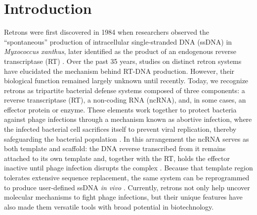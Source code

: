 

\chapter{Introduction}
\label{chapter1}
\thispagestyle{empty}


Retrons were first discovered in 1984 when researchers observed the
``spontaneous'' production of intracellular single-stranded DNA (ssDNA) in
\textit{Myxococcus xanthus}, later identified as the product of an endogenous
reverse transcriptase (RT) \cite{yee1984,lampson1989}. Over the past 35 years,
studies on distinct retron systems have elucidated the mechanism behind RT-DNA
production. However, their biological function remained largely unknown until
recently. Today, we recognize retrons as tripartite bacterial defense systems
composed of three components: a reverse transcriptase (RT), a non-coding RNA
(ncRNA), and, in some cases, an effector protein or enzyme. These elements work
together to protect bacteria against phage infections through a mechanism known
as abortive infection, where the infected bacterial cell sacrifices itself to
prevent viral replication, thereby safeguarding the bacterial population
\cite{millman2020,bobonis2022}. In this arrangement the ncRNA serves as both
template and scaffold: the DNA reverse transcribed from it remains attached to
its own template and, together with the RT, holds the effector inactive until
phage infection disrupts the complex \cite{wang2022,gao2020}.
Because that
template region tolerates extensive sequence replacement, the same system can be
reprogrammed to produce user-defined ssDNA \textit{in vivo}
\cite{simon2019,khan2025}. Currently, retrons not only help uncover molecular
mechanisms to fight phage infections, but their unique features have also made
them versatile tools with broad potential in biotechnology.


